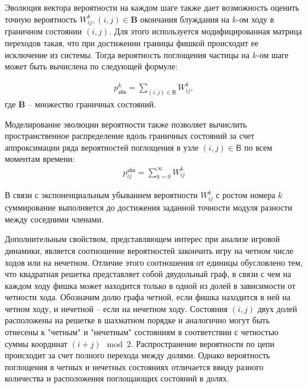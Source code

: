 Эволюция вектора вероятности на каждом шаге также дает возможность оценить точную вероятность $W_{ij}^{k}, (i, j) \in \boldsymbol{B}$ окончания блуждания на $k$-ом ходу в граничном состоянии $(i, j)$. Для этого используется модифицированная матрица переходов такая, что при достижении границы фишкой происходит ее исключение из системы. Тогда вероятность поглощения частицы на $k$-ом шаге может быть вычислена по следующей формуле:

\begin{equation}
    \begin{aligned}
    p_\mathsf{abs}^{k}=\sum_{(i, j) \in \boldsymbol{\mathsf{B}}} W_{ij}^{k},
    \label{eq:timedistr}
    \end{aligned}
\end{equation}
где $\textbf{B}$ -- множество граничных состояний.

Моделирование эволюции вероятности также позволяет вычислить пространственное распределение вдоль граничных состояний за счет аппроксимации ряда вероятностей поглощения в узле $(i, j) \in \boldsymbol{\mathsf{B}}$ по всем моментам времени:
\begin{equation}
    \begin{aligned}
    p_{ij}^\mathsf{abs}=\sum_{k=0}^{\infty} W_{ij}^{k}
    \label{eq:spacedistr}
    \end{aligned}
\end{equation}

В связи с экспоненциальным убыванием вероятности $W_{ij}^{k}$ с ростом номера $k$ суммирование выполняется до достижения заданной точности модуля разности между соседними членами.

Дополнительным свойством, представляющем интерес при анализе игровой динамики, является соотношение вероятностей закончить игру на четном числе ходов или на нечетном. Отличие этого соотношения от единицы обусловлено тем, что квадратная решетка представляет собой двудольный граф, в связи с чем на каждом ходу фишка может находится только в одной из долей в зависимости от четности хода. Обозначим долю графа четной, если фишка находится в ней на четном ходу, и нечетной -- если на нечетном ходу. Состояния $(i, j)$ двух долей расположены на решетке в шахматном порядке и аналогично могут быть отнесены к "четным" и "нечетным" состояниям в соответствии с четностью суммы координат $(i + j) \mod 2$. Распространение вероятности по цепи происходит за счет полного перехода между долями. Однако вероятность поглощения в четных и нечетных состояниях отличается ввиду разного количества и расположения поглощающих состояний в долях.

